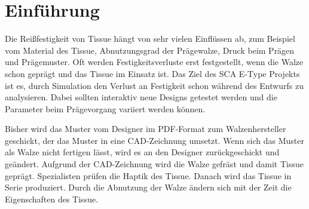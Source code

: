 



\chapter{Einf\"uhrung}
Die Rei\ss festigkeit von Tissue h\"angt von sehr vielen Einfl\"ussen ab, zum
Beispiel vom Material des Tissue, Abnutzungsgrad der Pr\"agewalze, Druck beim
Pr\"agen und Pr\"agemuster. Oft werden Festigkeitsverluste erst
festgestellt, wenn die Walze schon gepr\"agt und das Tissue im 
Einsatz ist. Das Ziel des SCA E-Type Projekts ist es, durch Simulation 
den Verlust an Festigkeit schon w\"ahrend des Entwurfs zu analysieren.
Dabei sollten interaktiv neue Designs getestet werden und die Parameter
beim Pr\"agevorgang variiert werden k\"onnen.

Bisher wird das Muster vom Designer im PDF-Format zum Walzenhersteller
geschickt, der das Muster in eine CAD-Zeichnung umsetzt. 
Wenn sich das Muster als Walze nicht fertigen l\"asst, wird es an den Designer
zur\"uckgeschickt und ge\"andert. Aufgrund der CAD-Zeichnung wird die Walze 
gefr\"ast und damit Tissue gepr\"agt. Spezialisten pr\"ufen die Haptik des Tissue. 
Danach wird das Tissue in Serie produziert. Durch die Abnutzung der Walze
\"andern sich mit der Zeit die Eigenschaften des Tissue. 

